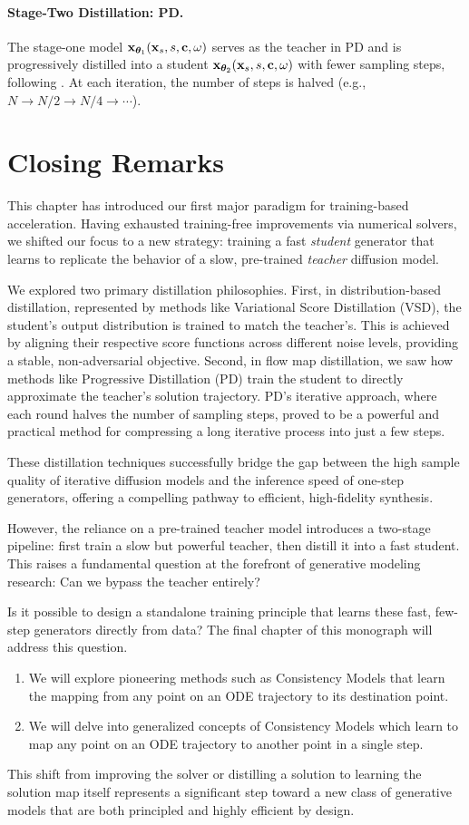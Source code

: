 \paragraph{Stage-Two Distillation: PD.}
The stage-one model ${\mathbf{x}}_{\bm{\theta}_1}({\mathbf{x}}_s, s, {\mathbf{c}}, \omega)$ serves as the
teacher in PD and is progressively distilled into a student
${\mathbf{x}}_{\bm{\theta}_2}({\mathbf{x}}_s, s, {\mathbf{c}}, \omega)$ with fewer sampling steps,
following . At each iteration, the number of steps is
halved (e.g., $N \to N/2 \to N/4 \to \cdots$).

\newpage
\section{Closing Remarks}\label{sec:ch10_cr}

This chapter has introduced our first major paradigm for training-based acceleration. Having exhausted training-free improvements via numerical solvers, we shifted our focus to a new strategy: training a fast \textit{student} generator that learns to replicate the behavior of a slow, pre-trained \textit{teacher} diffusion model.

We explored two primary distillation philosophies. First, in distribution-based distillation, represented by methods like Variational Score Distillation (VSD), the student's output distribution is trained to match the teacher's. This is achieved by aligning their respective score functions across different noise levels, providing a stable, non-adversarial objective. Second, in flow map distillation, we saw how methods like Progressive Distillation (PD) train the student to directly approximate the teacher's solution trajectory. PD's iterative approach, where each round halves the number of sampling steps, proved to be a powerful and practical method for compressing a long iterative process into just a few steps.

These distillation techniques successfully bridge the gap between the high sample quality of iterative diffusion models and the inference speed of one-step generators, offering a compelling pathway to efficient, high-fidelity synthesis.

However, the reliance on a pre-trained teacher model introduces a two-stage pipeline: first train a slow but powerful teacher, then distill it into a fast student. This raises a fundamental question at the forefront of generative modeling research: Can we bypass the teacher entirely?

Is it possible to design a standalone training principle that learns these fast, few-step generators directly from data? The final chapter of this monograph will address this question.
\begin{enumerate}
    \item We will explore pioneering methods such as Consistency Models that learn the mapping from any point on an ODE trajectory to its destination point.
    \item We will delve into generalized concepts of Consistency Models which learn to map any point on an ODE trajectory to another point in a single step.
\end{enumerate}

This shift from improving the solver or distilling a solution to learning the solution map itself represents a significant step toward a new class of generative models that are both principled and highly efficient by design. 

\clearpage
\newpage
